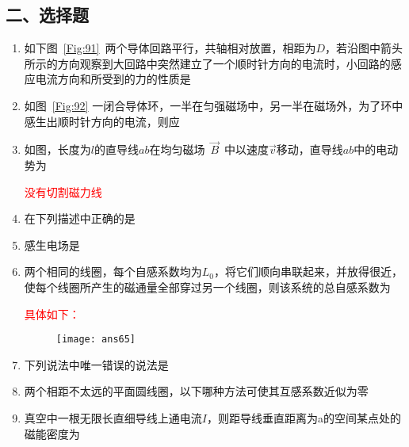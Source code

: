 \subsection*{二、选择题}
\begin{enumerate}
    \item 如下图~\ref{Fig:91}~两个导体回路平行，共轴相对放置，相距为$D$，若沿图中箭头所示的方向观察到大回路中突然建立了一个顺时针方向的电流时，小回路的感应电流方向和所受到的力的性质是~
    \item 如图~\ref{Fig:92} 一闭合导体环，一半在匀强磁场中，另一半在磁场外，为了环中感生出顺时针方向的电流，则应~
    \item 如图，长度为$l$的直导线$ab$在均匀磁场~$\vec{B}$~中以速度$\vec{v}$移动，直导线$ab$中的电动势为~
    \begin{note}
        \textcolor{red}{没有切割磁力线}
    \end{note}
    \item 在下列描述中正确的是~
    \item 感生电场是~
    \item 两个相同的线圈，每个自感系数均为$L_0$，将它们顺向串联起来，并放得很近，使每个线圈所产生的磁通量全部穿过另一个线圈，则该系统的总自感系数为~
    \begin{note}
        \textcolor{red}{具体如下：}
        \begin{figure}[H]
            \centering
            \texttt{[image: ans65]}
        \end{figure}
    \end{note}
    \item 下列说法中唯一错误的说法是~
    \item 两个相距不太远的平面圆线圈，以下哪种方法可使其互感系数近似为零~
    \item 真空中一根无限长直细导线上通电流$I$，则距导线垂直距离为a的空间某点处的磁能密度为~\spaces
\end{enumerate}
